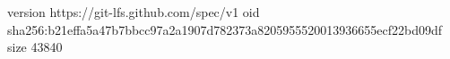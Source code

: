 version https://git-lfs.github.com/spec/v1
oid sha256:b21effa5a47b7bbcc97a2a1907d782373a8205955520013936655ecf22bd09df
size 43840
